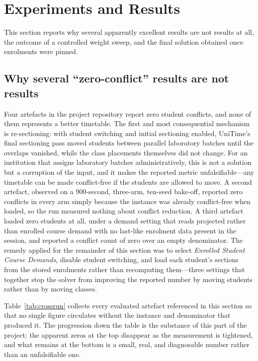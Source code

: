 \documentclass[journal]{IEEEtran}
\begin{document}
\section{Experiments and Results}
\label{sec:results}

This section reports why several apparently excellent results are not results at all, the outcome of a controlled weight sweep, and the final solution obtained once enrolments were pinned.

\subsection{Why several ``zero-conflict'' results are not results}
\label{sec:zero-conflict}
Four artefacts in the project repository report zero student conflicts, and none of them represents a better timetable. The first and most consequential mechanism is re-sectioning: with student switching and initial sectioning enabled, UniTime's final sectioning pass moved students between parallel laboratory batches until the overlaps vanished, while the class placements themselves did not change. For an institution that assigns laboratory batches administratively, this is not a solution but a corruption of the input, and it makes the reported metric unfalsifiable---any timetable can be made conflict-free if the students are allowed to move. A second artefact, observed on a 900-second, three-arm, ten-seed bake-off, reported zero conflicts in every arm simply because the instance was already conflict-free when loaded, so the run measured nothing about conflict reduction. A third artefact loaded zero students at all, under a demand setting that reads projected rather than enrolled course demand with no last-like enrolment data present in the session, and reported a conflict count of zero over an empty denominator. The remedy applied for the remainder of this section was to select \emph{Enrolled Student Course Demands}, disable student switching, and load each student's sections from the stored enrolments rather than recomputing them---three settings that together stop the solver from improving the reported number by moving students rather than by moving classes.

Table~\ref{tab:crossrun} collects every evaluated artefact referenced in this section so that no single figure circulates without the instance and denominator that produced it. The progression down the table is the substance of this part of the project: the apparent zeros at the top disappear as the measurement is tightened, and what remains at the bottom is a small, real, and diagnosable number rather than an unfalsifiable one.
\end{document}
